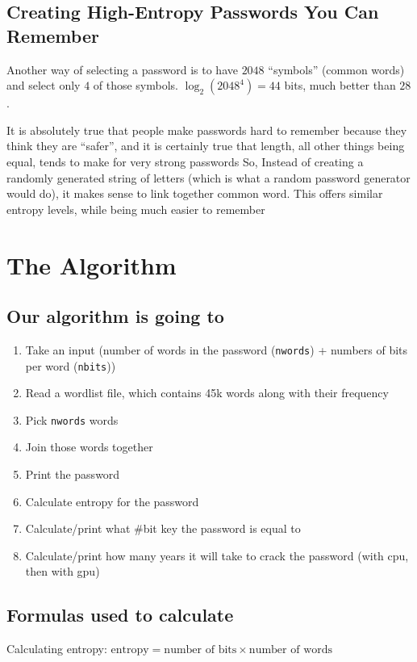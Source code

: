 \documentclass{scrartcl}
\begin{document}
\subsection{Creating High-Entropy Passwords You Can Remember}
\label{sec:orgfdccae6}
Another way of selecting a password is to have \(2048\) ``symbols'' (common words) and
select only \(4\) of those symbols. \(\log_{2}(2048^{4})=44\) bits, much better than \(28\).

It is absolutely true that people make passwords hard to remember because they
think they are ``safer'', and it is certainly true that length, all other things
being equal, tends to make for very strong passwords So, Instead of creating a
randomly generated string of letters (which is what a random password generator
would do), it makes sense to link together common word. This offers similar
entropy levels, while being much easier to remember

\section{The Algorithm}
\label{sec:orgff93592}
\subsection{Our algorithm is going to}
\label{sec:org60fd1c0}
\begin{enumerate}
\item Take an input (number of words in the password (\texttt{nwords}) + numbers of bits per
word (\texttt{nbits}))
\item Read a wordlist file, which contains 45k words along with their frequency
\item Pick \texttt{nwords} words
\item Join those words together
\item Print the password
\item Calculate entropy for the password
\item Calculate/print what \#bit key the password is equal to
\item Calculate/print how many years it will take to crack the password (with cpu,
then with gpu)
\end{enumerate}

\subsection{Formulas used to calculate}
\label{sec:org6b95da9}
Calculating entropy:
\(\text{entropy}=\text{number of bits}\times\text{number of words}\)
\end{document}
